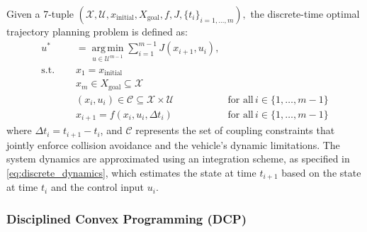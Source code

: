 Given a 7-tuple
$
	(\mathcal{X}, \mathcal{U}, x_{\text{initial}}, X_{\text{goal}}, f, J, \{t_i\}_{i=1,\dots ,m}),
$
the discrete-time optimal trajectory planning problem is defined as:
\begin{align}
	u^*     & = \underset{u \in \mathcal{U}^{m-1}}{\operatorname{arg\,min}} \sum_{i=1}^{m-1}
	J(x_{i+1}, u_{i}), \label{eq:obj}                                                                                                                                   \\ \text{s.t.
	} \quad & x_1  = x_{\text{initial}} \label{eq:init}                                                                                                                 \\
	        & x_m          \in X_{\text{goal}} \subseteq \mathcal{X} \label{eq:goal}                                                                                    \\
	        & (x_i, u_i)   \in \mathcal{C} \subseteq \mathcal{X} \times \mathcal{U}          & \text{for all}\, i \in \{1, \dots, m-1\} \label{eq:coupling_constraints} \\
	        & x_{i+1}      = f(x_i, u_i, \Delta t_i)                                         & \text{for all}\, i \in \{1, \dots, m-1\} \label{eq:discrete_dynamics}
\end{align}
where $\Delta t_i = t_{i+1} - t_i$, and $\mathcal{C}$ represents the set of coupling constraints that jointly enforce collision avoidance and the vehicle's dynamic limitations.
The system dynamics are approximated using an integration scheme, as specified in \eqref{eq:discrete_dynamics}, which estimates the state at time
$t_{i+1}$ based on the state at time $t_i$ and the control input $u_i$.

\subsubsection{Disciplined Convex Programming (DCP)}

